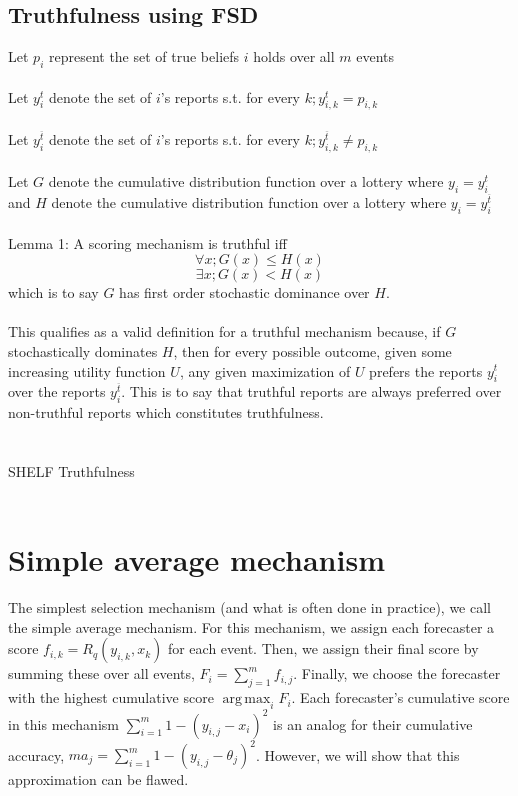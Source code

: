 \documentclass[letterpaper,12pt]{article}
\DeclareMathOperator*{\argmax}{arg\,max}
\newcommand{\1}{\mathbbm{1}}
\begin{document}
\subsection{Truthfulness using FSD}
Let $p_i$ represent the set of true beliefs $i$ holds over all $m$ events\\\\
Let $y_{i}^{t}$ denote the set of $i$'s reports s.t. for every $k; y_{i,k}^{t} = p_{i,k}$\\\\
Let $y_{i}^{\overline{t}}$ denote the set of $i$'s reports s.t. for every $k; y_{i,k}^{\overline{t}} \ne p_{i,k}$\\\\
Let $G$ denote the cumulative distribution function over a lottery where $y_i = y_{i}^{t}$ and $H$ denote the cumulative distribution function over a lottery where $y_i = y_{i}^{\overline{t}}$\\\\
Lemma 1: A scoring mechanism is truthful iff 
$$\forall x; G(x) \le H(x)$$
$$\exists x; G(x) < H(x)$$ 
which is to say $G$ has first order stochastic dominance over $H$.\\\\
This qualifies as a valid definition for a truthful mechanism because, if $G$ stochastically dominates $H$, then for every possible outcome, given some increasing utility function $U$, any given maximization of $U$ prefers the reports $y_{i}^{t}$ over the reports $y_{i}^{\overline{t}}$. This is to say that truthful reports are always preferred over non-truthful reports which constitutes truthfulness.\\\\\\
SHELF Truthfulness\\\\

\section{Simple average mechanism}
The simplest selection mechanism (and what is often done in practice), we call the simple average mechanism. For this mechanism, we assign each forecaster a score $f_{i, k} = R_q(y_{i, k}, x_k)$ for each event. Then, we assign their final score by summing these over all events, $F_i = \sum_{j=1}^m f_{i, j}$. Finally, we choose the forecaster with the highest cumulative score $\argmax_i F_i$. Each forecaster's cumulative score in this mechanism $\sum_{i=1}^m 1 - (y_{i, j} - x_i)^2$ is an analog for their cumulative accuracy, $m a_j = \sum_{i=1}^m 1 - (y_{i, j} - \theta_j)^2$. However, we will show that this approximation can be flawed.
\end{document}
